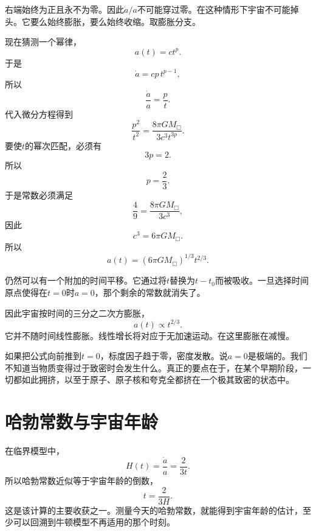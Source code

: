 右端始终为正且永不为零。因此\(\dot a/a\)不可能穿过零。在这种情形下宇宙不可能掉头。它要么始终膨胀，要么始终收缩。取膨胀分支。

现在猜测一个幂律，
\begin{equation}
a(t)=ct^p.
\end{equation}
于是
\begin{equation}
\dot a = cp\,t^{p-1},
\end{equation}
所以
\begin{equation}
\frac{\dot a}{a}=\frac{p}{t}.
\end{equation}
代入微分方程得到
\begin{equation}
\frac{p^2}{t^2}=\frac{8\pi G M_{\Box}}{3c^3t^{3p}}.
\end{equation}
要使\(t\)的幂次匹配，必须有
\begin{equation}
3p=2.
\end{equation}
所以
\begin{equation}
p=\frac{2}{3}.
\end{equation}
于是常数必须满足
\begin{equation}
\frac{4}{9}=\frac{8\pi G M_{\Box}}{3c^3},
\end{equation}
因此
\begin{equation}
c^3=6\pi G M_{\Box}.
\end{equation}
所以
\begin{equation}
a(t)=\left(6\pi G M_{\Box}\right)^{1/3}t^{2/3}.
\end{equation}

仍然可以有一个附加的时间平移。它通过将\(t\)替换为\(t-t_0\)而被吸收。一旦选择时间原点使得在\(t=0\)时\(a=0\)，那个剩余的常数就消失了。

因此宇宙按时间的三分之二次方膨胀，
\begin{equation}
a(t)\propto t^{2/3}.
\end{equation}
它并不随时间线性膨胀。线性增长将对应于无加速运动。在这里膨胀在减慢。

如果把公式向前推到\(t=0\)，标度因子趋于零，密度发散。说\(a=0\)是极端的。我们不知道当物质变得过于致密时会发生什么。真正的要点在于，在某个早期阶段，一切都如此拥挤，以至于原子、原子核和夸克全都挤在一个极其致密的状态中。

\section{哈勃常数与宇宙年龄}

在临界模型中，
\begin{equation}
H(t)=\frac{\dot a}{a}=\frac{2}{3t}.
\end{equation}
所以哈勃常数近似等于宇宙年龄的倒数，
\begin{equation}
t=\frac{2}{3H}.
\end{equation}
这是该计算的主要收获之一。测量今天的哈勃常数，就能得到宇宙年龄的估计，至少可以回溯到牛顿模型不再适用的那个时刻。

